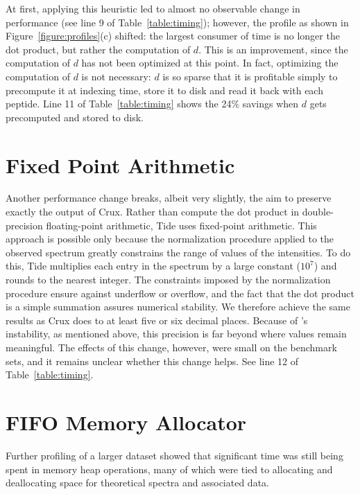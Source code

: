 At first, applying this heuristic led to almost no observable change in performance (see line 9
of Table~\ref{table:timing}); however, the profile as shown in
Figure~\ref{figure:profiles}(c) shifted: the largest consumer of time
is no longer the dot product, but rather the computation of $d$. This
is an improvement, since the computation of $d$ has not been optimized
at this point. In fact, optimizing the computation of $d$ is not
necessary: $d$ is so sparse that it is profitable simply to
precompute it at indexing time, store it to disk and read it back
with each peptide. Line 11 of Table~\ref{table:timing} shows the 24\%
savings when $d$ gets precomputed and stored to disk.

\section{Fixed Point Arithmetic \label{subsubsection:fixedpoint}}

Another performance change breaks, albeit very slightly, the aim to
preserve exactly the output of Crux. Rather than compute the dot
product in double-precision floating-point arithmetic, Tide uses
fixed-point arithmetic. This approach is possible only because the
normalization procedure applied to the observed spectrum greatly
constrains the range of values of the intensities. To do this, Tide
multiplies each entry in the spectrum by a large constant ($10^7$) and
rounds to the nearest integer. The constraints imposed by the
normalization procedure ensure against underflow or overflow, and the
fact that the dot product is a simple summation assures numerical
stability. We therefore achieve the same results as Crux does to at
least five or six decimal places. Because of \XCorr's instability, as
mentioned above, this precision is far beyond where \XCorr values
remain meaningful. The effects of this change, however, were small on
the benchmark sets, and it remains unclear whether this change
helps. See line 12 of Table~\ref{table:timing}.

\section{FIFO Memory Allocator \label{subsubsection:fifo}}

Further profiling of a larger dataset showed that significant time
was still being spent in memory heap operations, many of which were
tied to allocating and deallocating space for theoretical spectra and
associated data.

